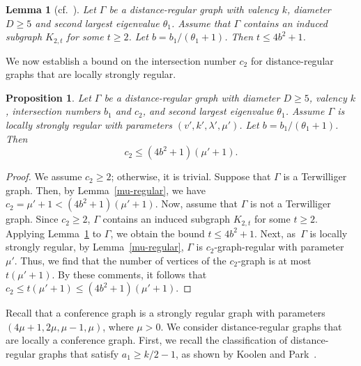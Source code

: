 \documentclass[11pt]{article}
\newtheorem{lemm}[theo]{Lemma}
\newtheorem{prop}[theo]{Proposition}
\theoremstyle{definition}
\numberwithin{equation}{section}
\numberwithin{equation}{section}
\begin{document}
\begin{lemm}[{cf.~\cite[Lemma 3.7]{TKCP2022}}]\label{bound on s}
Let $\Gamma$ be a distance-regular graph with valency $k$, diameter $D \geqslant 5$ and second largest eigenvalue $\theta_1$. Assume that $\Gamma$ contains an induced subgraph $K_{2,t}$ for some $t \geqslant 2$. Let $b = {b_1}/(\theta_1 +1)$. Then $t \leqslant 4b^2 +1$.
\end{lemm}

We now establish a bound on the intersection number $c_2$ for distance-regular graphs that are locally strongly regular. 

\begin{prop}
Let $\Gamma$ be a distance-regular graph with diameter $D\geqslant 5$, valency $k$, intersection numbers $b_1$ and $c_2$, and second largest eigenvalue $\theta_1$. 
Assume $\Gamma$ is locally strongly regular with parameters $(v',k',\lambda', \mu')$. 
Let $b = {b_1}/(\theta_1 +1)$. 
Then 
\begin{equation}\label{c2:bound}
	c_2 \leqslant (4b^2 +1)(\mu'+1).
\end{equation}
\end{prop}
\begin{proof}
We assume $c_2\geqslant 2$; otherwise, it is trivial.
Suppose that $\Gamma$ is a Terwilliger graph.
Then, by Lemma~\ref{mu-regular}, we have $c_2=\mu'+1 < (4b^2+1)(\mu'+1)$.
Now, assume that $\Gamma$ is not a Terwilliger graph.
Since $c_2\geqslant 2$, $\Gamma$ contains an induced subgraph $K_{2,t}$ for some $t\geqslant 2$.
Applying Lemma~\ref{bound on s} to $\Gamma$, we obtain the bound $t \leqslant 4b^2+1$.
Next, as~$\Gamma$ is locally strongly regular, by Lemma~\ref{mu-regular}, $\Gamma$ is $c_2$-graph-regular with parameter~$\mu'$.
Thus, we find that the number of vertices of the $c_2$-graph is at most $t(\mu'+1)$.
By these comments, it follows that $c_2 \leqslant t(\mu'+1) \leqslant (4b^2+1)(\mu'+1)$.
\end{proof}

Recall that a conference graph is a strongly regular graph with parameters $(4\mu +1, 2\mu, \mu-1, \mu)$, where $\mu > 0$. 
We consider distance-regular graphs that are locally a conference graph. 
First, we recall the classification of distance-regular graphs that satisfy $a_1 \geqslant k/2-1$, as shown by Koolen and Park~\cite{KP2012}.
\end{document}
